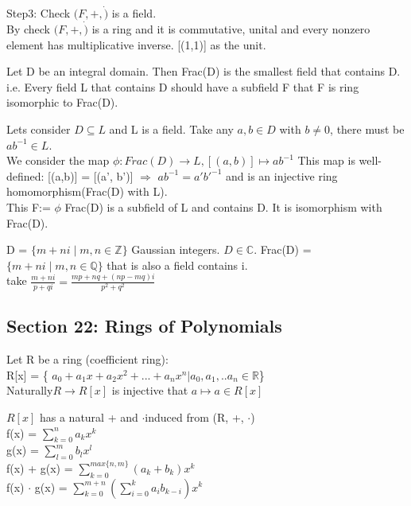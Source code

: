 \documentclass{article}
\newcommand\R{\ensuremath{\mathbb{R}}}
\newcommand\Z{\ensuremath{\mathbb{Z}}}
\newcommand\Q{\ensuremath{\mathbb{Q}}}
\newcommand\C{\ensuremath{\mathbb{C}}}
\begin{document}
\item Step3: Check $(F,+, \dot )$ is a field.
\\By check  $(F,+, \dot )$ is a ring and it is commutative, unital and every nonzero element has multiplicative inverse. [(1,1)] as the unit.
\newpage


\begin{theorem}
    Let D be an integral domain. Then Frac(D) is the smallest field that contains D.
    \\i.e. Every field L that contains D should have a subfield F that F is ring isomorphic to Frac(D).
\end{theorem}

\begin{Proof}
Lets consider $D\subseteq L $ and L is a field. Take any $a, b \in D $ with $b\neq 0$, there must be $ab^{-1} \in L$.
\\ We consider the map $\phi: Frac(D) \rightarrow L, [(a,b)]\mapsto ab^{-1}$
This map is well-defined: [(a,b)] = [(a', b')] $\Rightarrow$ $ab^{-1} = a'b'^{-1}$  and is an injective ring homomorphism(Frac(D) with L). 
\\This F:= $\phi$ Frac(D) is a subfield of L and contains D. It is isomorphism with Frac(D).
\end{Proof}
\begin{Example}
    D = $\{ m + ni \mid m,n \in \Z \}$ Gaussian integers.
    $D \in \C$.
    Frac(D) = $\{ m + ni \mid m,n \in \Q \}$ that is also a field contains i. 
    \\ take $\frac{m + ni}{p + qi} = \frac{mp+nq + (np-mq)i}{p^2 + q^2}$
\end{Example} 

\newpage


\subsection{Section 22: Rings of Polynomials}
\begin{Def}
    Let R be a ring (coefficient ring):
    \\R[x] = \{ $a_0 + a_1x+a_2x^2+...+a_nx^n| a_0, a_1,..a_n \in \R$\} 
    \\Naturally$R\rightarrow R[x]$ is injective  that $a \mapsto a \in R[x]$
\end{Def}

\begin{note}
    $R[x]$ has a natural + and $\cdot $induced from (R, +, $\cdot$)
    \\f(x) = $\sum_{k=0}^n a_kx^k$  
    \\g(x) = $\sum_{l=0}^m b_lx^l$
    \\f(x) + g(x) = $\sum_{k=0}^{max\{ n,m\}} (a_k+b_k)x^k$
    \\f(x) $\cdot$ g(x) =  $\sum_{k=0}^{m+n} ({\sum_{i=0}^k a_i b _{k-i}})x^k$

\end{note}
\end{document}
